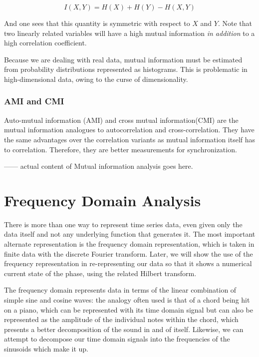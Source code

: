 \documentclass[12pt]{article}
\begin{document}
$$I(X, Y) = H(X) + H(Y) - H(X, Y)$$

And one sees that this quantity is symmetric with respect to $X$ and $Y$. Note that two linearly related variables will have a high mutual information \emph{in addition} to a high correlation coefficient.

Because we are dealing with real data, mutual information must be estimated from probability distributions represented as histograms. This is problematic in high-dimensional data, owing to the curse of dimensionality\cite{bellman}.%

\subsubsection{AMI and CMI}

Auto-mutual information (AMI) and cross mutual information(CMI) are the mutual information analogues to autocorrelation and cross-correlation. They have the same advantages over the correlation variants as mutual information itself has to correlation. Therefore, they are better measurements for synchronization.


------ actual content of Mutual information analysis goes here.

\section{Frequency Domain Analysis}

There is more than one way to represent time series data, even given only the data itself and not any underlying function that generates it. The most important alternate representation is the frequency domain representation, which is taken in finite data with the discrete Fourier transform. Later, we will show the use of the frequency representation in re-representing our data so that it shows a numerical current state of the phase, using the related Hilbert transform.

The frequency domain represents data in terms of the linear combination of simple sine and cosine waves: the analogy often used is that of a chord being hit on a piano, which can be represented with its time domain signal but can also be represented as the amplitude of the individual notes within the chord, which presents a better decomposition of the sound in and of itself. Likewise, we can attempt to decompose our time domain signals into the frequencies of the sinusoids which make it up.
\end{document}
